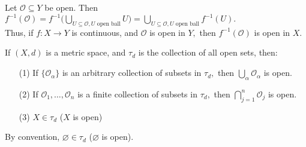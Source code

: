 \noindent Let $\mathcal{O}\subseteq Y$ be open. Then $f^{-1}(\mathcal{O})=f^{-1}\Big(\bigcup\limits_{U\subseteq\mathcal{O}, U\text{ open ball}} U\Big)=\bigcup\limits_{U\subseteq\mathcal{O}, U\text{ open ball}} f^{-1}(U).$ \\ Thus, if $f:X\rightarrow Y$ is continuous, and $\mathcal{O}$ is open in $Y,$ then $f^{-1}(\mathcal{O})$ is open in $X.$
\begin{thm}
If $(X,d)$ is a metric space, and $\tau_d$ is the collection of all open sets, then:
\begin{enumerate}
\item[(1)] If $\{\mathcal{O}_{\alpha}\}$ is an arbitrary collection of subsets in $\tau_d,$ then $\bigcup_{\alpha}\mathcal{O}_{\alpha}$ is open.
\item[(2)] If $\mathcal{O}_1,\hdots,\mathcal{O}_n$ is a finite collection of subsets in $\tau_d,$ then $\bigcap\limits_{j=1}^n \mathcal{O}_j$ is open.
\item[(3)] $X\in\tau_d$ ($X$ is open)
\end{enumerate}
\end{thm}
\noindent By convention, $\varnothing\in\tau_d$ ($\varnothing$ is open).
